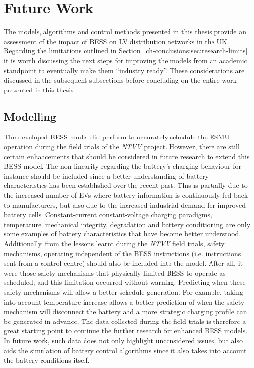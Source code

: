 \section{Future Work}
\label{ch-conclusions:sec:future-work}

The models, algorithms and control methods presented in this thesis provide an assessment of the impact of BESS on LV distribution networks in the UK.
Regarding the limitations outlined in Section~\ref{ch-conclusions:sec:research-limits} it is worth discussing the next steps for improving the models from an academic standpoint to eventually make them ``industry ready''.
These considerations are discussed in the subsequent subsections before concluding on the entire work presented in this thesis.

\subsection{Modelling}

The developed BESS model did perform to accurately schedule the ESMU operation during the field trials of the \textit{NTVV} project.
However, there are still certain enhancements that should be considered in future research to extend this BESS model.
The non-linearity regarding the battery's charging behaviour for instance should be included since a better understanding of battery characteristics has been established over the recent past.
This is partially due to the increased number of EVs where battery information is continuously fed back to manufacturers, but also due to the increased industrial demand for improved battery cells.
Constant-current constant-voltage charging paradigms, temperature, mechanical integrity, degradation and battery conditioning are only some examples of battery characteristics that have become better understood.
Additionally, from the lessons learnt during the \textit{NTVV} field trials, safety mechanisms, operating independent of the BESS instructions (i.e. instructions sent from a control centre) should also be included into the model.
After all, it were those safety mechanisms that physically limited BESS to operate as scheduled; and this limitation occurred without warning.
Predicting when these safety mechanisms will allow a better schedule generation.
For example, taking into account temperature increase allows a better prediction of when the safety mechanism will disconnect the battery and a more strategic charging profile can be generated in advance.
The data collected during the field trials is therefore a great starting point to continue the further research for enhanced BESS models.
In future work, such data does not only highlight unconsidered issues, but also aids the simulation of battery control algorithms since it also takes into account the battery conditions itself.

